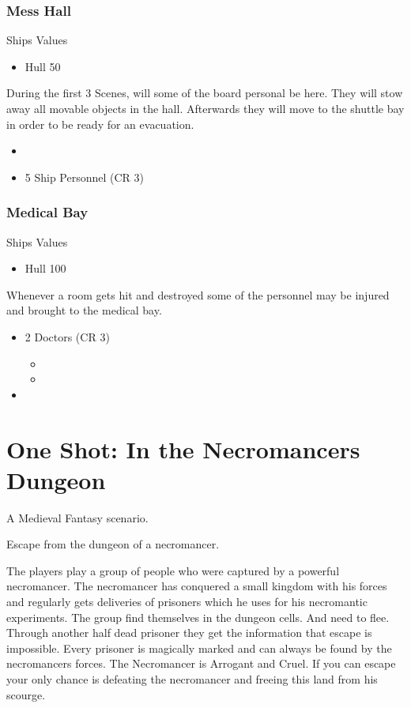 \documentclass[11pt]{article}
\begin{document}
{\subsubsection{Mess Hall}
\label{sec:org140b727}
Ships Values
\begin{itemize}
\item Hull 50
\end{itemize}

During the first 3 Scenes, will some of the board personal be here. They will stow away all movable objects in the hall. Afterwards they will move to the shuttle bay in order to be ready for an evacuation.

\begin{itemize}
\item \aspect{}
\item 5 Ship Personnel (CR 3)
\end{itemize}
\subsubsection{Medical Bay}
\label{sec:orgd4434b4}
Ships Values
\begin{itemize}
\item Hull 100
\end{itemize}

Whenever a room gets hit and destroyed some of the personnel may be injured and brought to the medical bay. 

\begin{itemize}
\item 2 Doctors (CR 3)
\begin{itemize}
\item {}
\item {}
\end{itemize}
\item {}
\end{itemize}
\section{One Shot: In the Necromancers Dungeon}
\label{sec:org178490a}

A Medieval Fantasy scenario.

Escape from the dungeon of a necromancer.

The players play a group of people who were captured by a powerful necromancer. The necromancer has conquered a small kingdom with his forces and regularly gets deliveries of prisoners which he uses for his necromantic experiments. The group find themselves in the dungeon cells. And need to flee. Through another half dead prisoner they get the information that escape is impossible. Every prisoner is magically marked and can always be found by the necromancers forces. The Necromancer is Arrogant and Cruel. If you can escape your only chance is defeating the necromancer and freeing this land from his scourge.  
}
\end{document}
